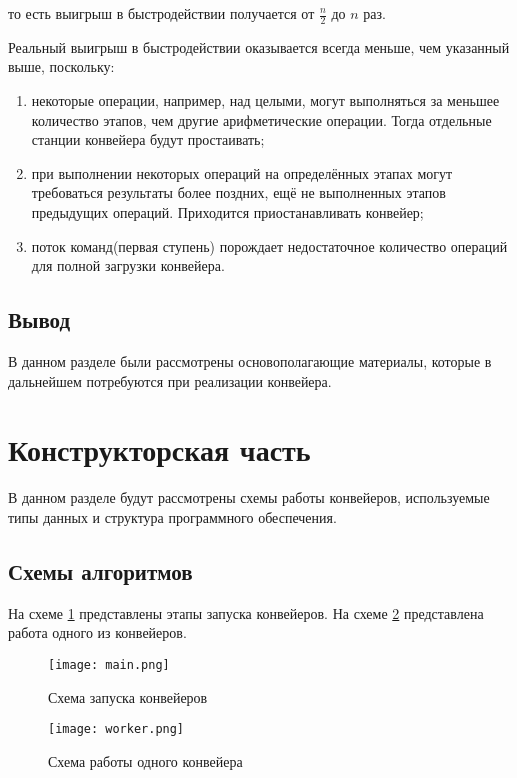 то есть выигрыш в быстродействии получается от $\frac{n}{2}$  до $n$ раз.

Реальный выигрыш в быстродействии оказывается всегда меньше, чем указанный выше, поскольку:

\begin{enumerate}
\item[1)] некоторые операции, например, над целыми, могут выполняться за меньшее количество этапов, чем другие арифметические операции. Тогда отдельные станции конвейера будут простаивать;
\item[2)] при выполнении некоторых операций на определённых этапах могут требоваться результаты более поздних, ещё не выполненных этапов предыдущих операций. Приходится приостанавливать конвейер;
\item[3)] поток команд(первая ступень) порождает недостаточное количество операций для полной загрузки конвейера.
\end{enumerate}


\subsection{Вывод}

В данном разделе были рассмотрены
основополагающие материалы, которые в дальнейшем потребуются
при реализации конвейера.

\section{Конструкторская часть}

В данном разделе будут рассмотрены схемы работы конвейеров, используемые типы данных и структура программного обеспечения.

\subsection{Схемы алгоритмов}

На схеме \ref{img:main} представлены этапы запуска конвейеров.
На схеме \ref{img:worker} представлена работа одного из конвейеров.

\begin{figure}[H]
    \centering
    \texttt{[image: main.png]}
    \caption{Схема запуска конвейеров}
    \label{img:main}
\end{figure}

\begin{figure}[H]
    \centering
    \texttt{[image: worker.png]}
    \caption{Схема работы одного конвейера}
    \label{img:worker}
\end{figure}

